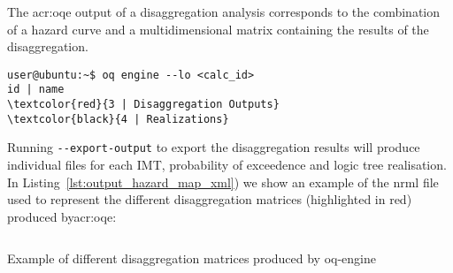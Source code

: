 The \glsdesc{acr:oqe} output of a disaggregation analysis corresponds to the
combination of a hazard curve and a multidimensional matrix containing the
results of the disaggregation.

\begin{Verbatim}[frame=single, commandchars=\\\{\}, fontsize=\small]
user@ubuntu:~$ oq engine --lo <calc_id>
id | name
\textcolor{red}{3 | Disaggregation Outputs}
\textcolor{black}{4 | Realizations}
\end{Verbatim}
%

Running \texttt{-{}-export-output} to export the disaggregation results will
produce individual files for each IMT, probability of exceedence and logic tree
realisation. In Listing~\ref{lst:output_hazard_map_xml}) we show an example of
the nrml file used to represent the different disaggregation matrices (highlighted
in red) produced by\gls{acr:oqe}:

\begin{listing}[htbp]
  \inputminted[firstline=1,firstnumber=1,fontsize=\footnotesize,frame=single,linenos,bgcolor=lightgray]{xml}{oqum/hazard/verbatim/output_disaggregation_matrix}
  \caption{Example of different disaggregation matrices produced by oq-engine}
  \label{lst:output_uhs}
\end{listing}
